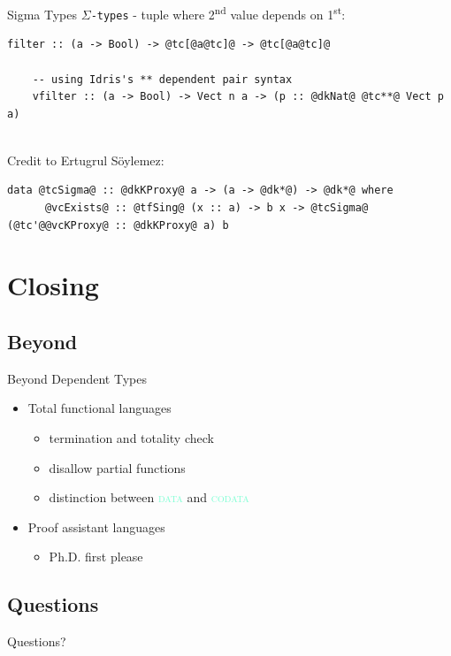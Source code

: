 \documentclass[xcolor={usenames,dvipsnames}]{beamer}
\newcommand{\hkeyword}[1]{\textcolor{Aquamarine}{\textsc{#1}}}
\begin{document}
\begin{frame}[fragile]{Sigma Types}
  \texttt{$\Sigma$-types} - tuple where 2\textsuperscript{nd} value depends on 1\textsuperscript{st}:
  \begin{lstlisting}[style=hask]
    filter :: (a -> Bool) -> @tc[@a@tc]@ -> @tc[@a@tc]@

    -- using Idris's ** dependent pair syntax
    vfilter :: (a -> Bool) -> Vect n a -> (p :: @dkNat@ @tc**@ Vect p a)
  \end{lstlisting}

  \ \\
  \pause
  Credit to Ertugrul S\"oylemez: 
  \begin{lstlisting}[style=hask]
    data @tcSigma@ :: @dkKProxy@ a -> (a -> @dk*@) -> @dk*@ where
      @vcExists@ :: @tfSing@ (x :: a) -> b x -> @tcSigma@ (@tc'@@vcKProxy@ :: @dkKProxy@ a) b
  \end{lstlisting}
\end{frame}


\section{Closing}

\subsection{Beyond}

\begin{frame}[fragile]{Beyond Dependent Types}
  \begin{itemize}
    \item Total functional languages
      \begin{itemize}
        \item termination and totality check
        \item disallow partial functions
        \item distinction between \hkeyword{data} and \hkeyword{codata}
      \end{itemize}
    \pause
    \item Proof assistant languages
      \begin{itemize}
        \item Ph.D. first please
      \end{itemize}
  \end{itemize}
\end{frame}


\subsection{Questions}

\begin{frame}
  Questions?
\end{frame}
\end{document}
